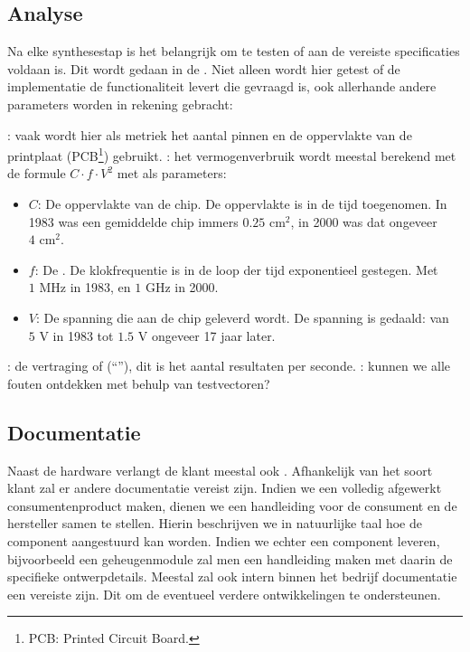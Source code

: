\subsection{Analyse}
Na elke synthesestap is het belangrijk om te testen of aan de vereiste specificaties voldaan is. Dit wordt gedaan in de . Niet alleen wordt hier getest of de implementatie de functionaliteit levert die gevraagd is, ook allerhande andere parameters worden in rekening gebracht:
\begin{itemize}
 : vaak wordt hier als metriek het aantal pinnen en de oppervlakte van de printplaat (PCB\footnote{PCB: Printed Circuit Board.}) gebruikt.
 : het vermogenverbruik wordt meestal berekend met de formule $C\cdot f\cdot V^2$ met als parameters:
 \begin{itemize}
  \item $C$: De oppervlakte van de chip. De oppervlakte is in de tijd toegenomen. In 1983 was een gemiddelde chip immers $0.25\mbox{ cm}^2$, in 2000 was dat ongeveer $4\mbox{ cm}^2$.
  \item $f$: De . De klokfrequentie is in de loop der tijd exponentieel gestegen. Met $1\mbox{ MHz}$ in 1983, en $1\mbox{ GHz}$ in 2000.
  \item $V$: De spanning die aan de chip geleverd wordt. De spanning is gedaald: van $5\mbox{ V}$ in 1983 tot $1.5\mbox{ V}$ ongeveer 17 jaar later.
 \end{itemize}
 : de vertraging of  (``''), dit is het aantal resultaten per seconde.
 : kunnen we alle fouten ontdekken met behulp van testvectoren?
\end{itemize}

\subsection{Documentatie}
Naast de hardware verlangt de klant meestal ook . Afhankelijk van het soort klant zal er andere documentatie vereist zijn. Indien we een volledig afgewerkt consumentenproduct maken, dienen we een handleiding voor de consument en de hersteller samen te stellen. Hierin beschrijven we in natuurlijke taal hoe de component aangestuurd kan worden. Indien we echter een component leveren, bijvoorbeeld een geheugenmodule zal men een handleiding maken met daarin de specifieke ontwerpdetails. Meestal zal ook intern binnen het bedrijf documentatie een vereiste zijn. Dit om de eventueel verdere ontwikkelingen te ondersteunen.

